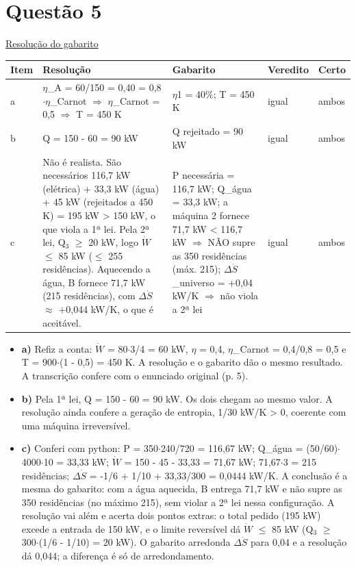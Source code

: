 \documentclass{article}%
\begin{document}
\section*{Questão 5}%
\href{https://poliedroresolve.sistemapoliedro.com.br/vestibulares/ime/2027/ime-2-fase-dia-2-27-10-2026-2-fase-dia-2/dissertativa-5-fisica-2-fase-dia-2-ime-2027}{Resolução do gabarito}\par\smallskip%
\begin{longtable}{@{}p{} p{} p{} p{} p{}@{}}\toprule Item & Resolução & Gabarito & Veredito & Certo \\ \midrule
a & $\eta$\_A = 60/150 = 0,40 = 0,8$\cdot$$\eta$\_Carnot $\Rightarrow$ $\eta$\_Carnot = 0,5 $\Rightarrow$ T = 450 K & $\eta$1 = 40\%; T = 450 K & igual & ambos \\
b & Q = 150 - 60 = 90 kW & Q rejeitado = 90 kW & igual & ambos \\
c & Não é realista. São necessários 116,7 kW (elétrica) + 33,3 kW (água) + 45 kW (rejeitados a 450 K) = 195 kW > 150 kW, o que viola a 1ª lei. Pela 2ª lei, Q$_{3}$ $\geq$ 20 kW, logo $\dot W$ $\leq$ 85 kW ($\leq$ 255 residências). Aquecendo a água, B fornece 71,7 kW (215 residências), com $\Delta$$\dot S$ $\approx$ +0,044 kW/K, o que é aceitável. & P necessária = 116,7 kW; Q\_água = 33,3 kW; a máquina 2 fornece 71,7 kW < 116,7 kW $\Rightarrow$ NÃO supre as 350 residências (máx. 215); $\Delta$$\dot S$\_universo = +0,04 kW/K $\Rightarrow$ não viola a 2ª lei & igual & ambos \\
\bottomrule\end{longtable}%
\begin{itemize}%
\item%
\textbf{a)} Refiz a conta: $\dot W$ = 80$\cdot$3/4 = 60 kW, $\eta$ = 0,4, $\eta$\_Carnot = 0,4/0,8 = 0,5 e T = 900$\cdot$(1 - 0,5) = 450 K. A resolução e o gabarito dão o mesmo resultado. A transcrição confere com o enunciado original (p. 5).%
\item%
\textbf{b)} Pela 1ª lei, Q = 150 - 60 = 90 kW. Os dois chegam ao mesmo valor. A resolução ainda confere a geração de entropia, 1/30 kW/K > 0, coerente com uma máquina irreversível.%
\item%
\textbf{c)} Conferi com python: P = 350$\cdot$240/720 = 116,67 kW; Q\_água = (50/60)$\cdot$4000$\cdot$10 = 33,33 kW; $\dot W$ = 150 - 45 - 33,33 = 71,67 kW; 71,67$\cdot$3 = 215 residências; $\Delta$$\dot S$ = -1/6 + 1/10 + 33,33/300 = 0,0444 kW/K. A conclusão é a mesma do gabarito: com a água aquecida, B entrega 71,7 kW e não supre as 350 residências (no máximo 215), sem violar a 2ª lei nessa configuração. A resolução vai além e acerta dois pontos extras: o total pedido (195 kW) excede a entrada de 150 kW, e o limite reversível dá $\dot W$ $\leq$ 85 kW (Q$_{3}$ $\geq$ 300$\cdot$(1/6 - 1/10) = 20 kW). O gabarito arredonda $\Delta$$\dot S$ para 0,04 e a resolução dá 0,044; a diferença é só de arredondamento.%
\end{itemize}%
\end{document}
